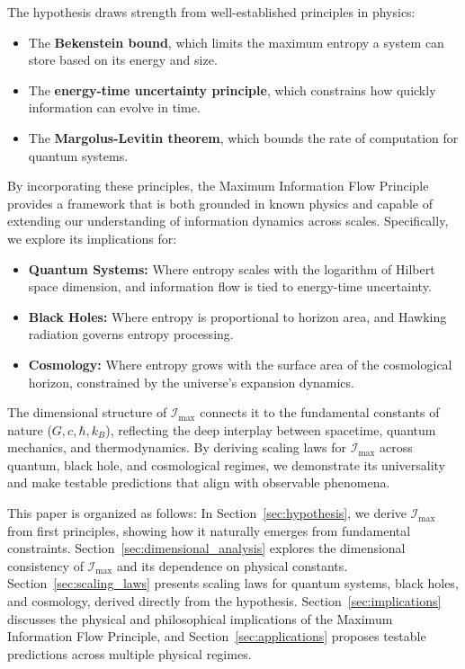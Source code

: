 \documentclass[12pt]{article}
\begin{document}
The hypothesis draws strength from well-established principles in physics:
\begin{itemize}
    \item The \textbf{Bekenstein bound}, which limits the maximum entropy a system can store based on its energy and size.
    \item The \textbf{energy-time uncertainty principle}, which constrains how quickly information can evolve in time.
    \item The \textbf{Margolus-Levitin theorem}, which bounds the rate of computation for quantum systems.
\end{itemize}

By incorporating these principles, the Maximum Information Flow Principle provides a framework that is both grounded in known physics and capable of extending our understanding of information dynamics across scales. Specifically, we explore its implications for:
\begin{itemize}
    \item \textbf{Quantum Systems:} Where entropy scales with the logarithm of Hilbert space dimension, and information flow is tied to energy-time uncertainty.
    \item \textbf{Black Holes:} Where entropy is proportional to horizon area, and Hawking radiation governs entropy processing.
    \item \textbf{Cosmology:} Where entropy grows with the surface area of the cosmological horizon, constrained by the universe's expansion dynamics.
\end{itemize}

The dimensional structure of \( \mathcal{I}_{\text{max}} \) connects it to the fundamental constants of nature (\( G, c, \hbar, k_B \)), reflecting the deep interplay between spacetime, quantum mechanics, and thermodynamics. By deriving scaling laws for \( \mathcal{I}_{\text{max}} \) across quantum, black hole, and cosmological regimes, we demonstrate its universality and make testable predictions that align with observable phenomena.

This paper is organized as follows: In Section~\ref{sec:hypothesis}, we derive \( \mathcal{I}_{\text{max}} \) from first principles, showing how it naturally emerges from fundamental constraints. Section~\ref{sec:dimensional_analysis} explores the dimensional consistency of \( \mathcal{I}_{\text{max}} \) and its dependence on physical constants. Section~\ref{sec:scaling_laws} presents scaling laws for quantum systems, black holes, and cosmology, derived directly from the hypothesis. Section~\ref{sec:implications} discusses the physical and philosophical implications of the Maximum Information Flow Principle, and Section~\ref{sec:applications} proposes testable predictions across multiple physical regimes.
\end{document}
